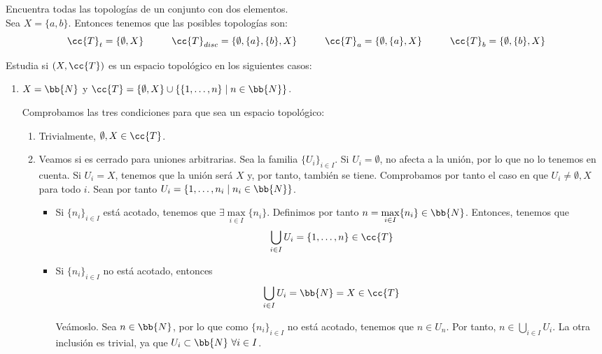 \begin{ejercicio}
    Encuentra todas las topologías de un conjunto con dos elementos.\\

    Sea $X=\{a,b\}$. Entonces tenemos que las posibles topologías son:
    \begin{equation*}
        \cc{T}_t = \{\emptyset, X\}
        \hspace{1cm} \cc{T}_{disc} = \{\emptyset, \{a\}, \{b\}, X\}
        \hspace{1cm} \cc{T}_a = \{\emptyset, \{a\}, X\}
        \hspace{1cm} \cc{T}_b = \{\emptyset, \{b\}, X\}
    \end{equation*}
\end{ejercicio}

\begin{ejercicio}
    Estudia si $(X,\cc{T})$ es un espacio topológico en los siguientes casos:
    \begin{enumerate}[label=\alph*)]
        \item $X=\bb{N}$ y $\cc{T}=\{\emptyset, X\}\cup \left\{\{1,\dots, n\}\mid n\in \bb{N}\right\}$.

        Comprobamos las tres condiciones para que sea un espacio topológico:
        \begin{enumerate}
            \item Trivialmente, $\emptyset, X\in \cc{T}$.
            \item Veamos si es cerrado para uniones arbitrarias. Sea la familia $\{U_i\}_{i\in I}$. Si $U_i=\emptyset$, no afecta a la unión, por lo que no lo tenemos en cuenta. Si $U_i=X$, tenemos que la unión será $X$ y, por tanto, también se tiene. Comprobamos por tanto el caso en que $U_i\neq \emptyset, X$ para todo $i$. Sean por tanto $U_i=\{1,\dots, n_i\mid n_i\in \bb{N}\}$.
            \begin{itemize}
                \item Si $\{n_i\}_{i\in I}$ está acotado, tenemos que $\exists \max\limits_{i\in I}\{n_i\}$. Definimos por tanto $n=\max\limits_{i\in I}\{n_i\}\in \bb{N}$. Entonces, tenemos que
                $$\bigcup_{i\in I}U_i = \{1,\dots, n\}\in \cc{T}$$

                \item Si $\{n_i\}_{i\in I}$ no está acotado, entonces $$\bigcup_{i\in I}U_i = \bb{N}=X\in \cc{T}$$

                Veámoslo. Sea $n\in \bb{N}$, por lo que como $\{n_i\}_{i\in I}$ no está acotado, tenemos que $n\in U_n$. Por tanto, $n\in \bigcup\limits_{i\in I}U_i$. La otra inclusión es trivial, ya que $U_i\subset \bb{N}~\forall i\in I$.
            \end{itemize}


\end{enumerate}
\end{enumerate}
\end{ejercicio}
